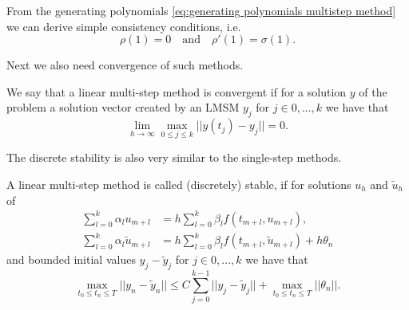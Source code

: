 	From the generating polynomials \eqref{eq:generating polynomials multistep method} we can derive simple consistency conditions, i.e.
	\begin{displaymath}
		\rho(1) = 0 \quad \text{and} \quad \rho'(1) = \sigma(1).
	\end{displaymath}

	Next we also need convergence of such methods.
	
	\begin{definition} \label{def: LMSM convergence}
		We say that a linear multi-step method is convergent if for a solution $y$ of the problem a solution vector created by an LMSM $y_j$ for $j \in {0,...,k}$ we have that
		\begin{displaymath}
			\lim\limits_{h \to \infty} \max_{0 \leq j \leq k} ||y(t_j) - y_j|| = 0.
		\end{displaymath}
	\end{definition}
	
	
	The discrete stability is also very similar to the single-step methods.
	\begin{definition} \label{discrete stability LMSM}
		A linear multi-step method is called (discretely) stable, if for solutions $u_h$ and $\tilde{u}_h$ of
		\begin{align}
			\sum_{l=0}^{k} \alpha_l u_{m+l} &= h \sum_{l=0}^{k} \beta_l f(t_{m+l}, u_{m+l}), \\
			\sum_{l=0}^{k} \alpha_l \tilde{u}_{m+l} &= h \sum_{l=0}^{k} \beta_l f(t_{m+l}, \tilde{u}_{m+l}) + h\theta_n
		\end{align} 
		and bounded initial values $y_j - \tilde{y}_j$ for $j \in {0,...,k}$ we have that
		\begin{displaymath}
			\max_{t_0 \leq t_n \leq T} ||y_n - \tilde{y}_n|| \leq C \sum_{j=0}^{k-1} ||y_j - \tilde{y}_j|| + \max_{t_0 \leq t_n \leq T} ||\theta_n||.
		\end{displaymath}
	\end{definition}
	
	
